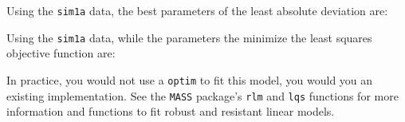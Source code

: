 \documentclass[]{book}
\newenvironment{Shaded}{\begin{snugshade}}{\end{snugshade}}
\newcommand{\CommentTok}[1]{\textcolor[rgb]{0.56,0.35,0.01}{\textit{#1}}}
\newcommand{\ControlFlowTok}[1]{\textcolor[rgb]{0.13,0.29,0.53}{\textbf{#1}}}
\newcommand{\DataTypeTok}[1]{\textcolor[rgb]{0.13,0.29,0.53}{#1}}
\newcommand{\DecValTok}[1]{\textcolor[rgb]{0.00,0.00,0.81}{#1}}
\newcommand{\KeywordTok}[1]{\textcolor[rgb]{0.13,0.29,0.53}{\textbf{#1}}}
\newcommand{\NormalTok}[1]{#1}
\newcommand{\OperatorTok}[1]{\textcolor[rgb]{0.81,0.36,0.00}{\textbf{#1}}}
\newcommand{\StringTok}[1]{\textcolor[rgb]{0.31,0.60,0.02}{#1}}
\theoremstyle{definition}
\theoremstyle{definition}
\theoremstyle{definition}
\theoremstyle{remark}
\begin{document}
\begin{Shaded}
\end{Shaded}

Using the \texttt{sim1a} data, the best parameters of the least absolute
deviation are:

\begin{Shaded}
\end{Shaded}

Using the \texttt{sim1a} data, while the parameters the minimize the
least squares objective function are:

\begin{Shaded}
\end{Shaded}

In practice, you would not use a \texttt{optim} to fit this model, you
would you an existing implementation. See the \texttt{MASS} package's
\texttt{rlm} and \texttt{lqs} functions for more information and
functions to fit robust and resistant linear models.
\end{document}
